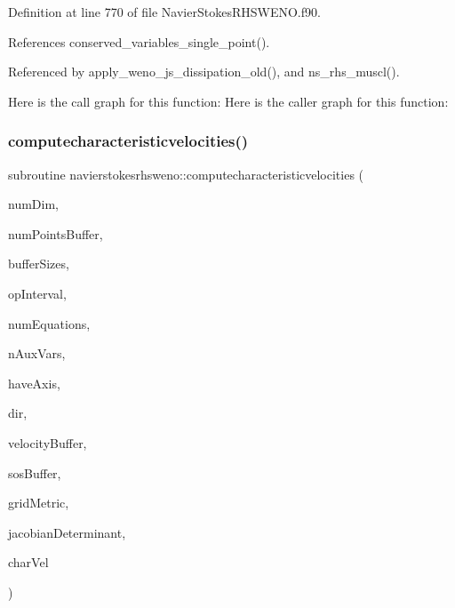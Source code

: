 Definition at line 770 of file Navier\+Stokes\+R\+H\+S\+W\+E\+N\+O.\+f90.



References conserved\+\_\+variables\+\_\+single\+\_\+point().



Referenced by apply\+\_\+weno\+\_\+js\+\_\+dissipation\+\_\+old(), and ns\+\_\+rhs\+\_\+muscl().

Here is the call graph for this function\+:
Here is the caller graph for this function\+:
\hypertarget{namespacenavierstokesrhsweno_a4481b668ca0b9a3c6adf1ebc7649268f}{}\label{namespacenavierstokesrhsweno_a4481b668ca0b9a3c6adf1ebc7649268f} 
\subsubsection{\texorpdfstring{computecharacteristicvelocities()}{computecharacteristicvelocities()}}
{\footnotesize\ttfamily subroutine navierstokesrhsweno\+::computecharacteristicvelocities (\begin{DoxyParamCaption}\item[{integer(kind=4), intent(in)}]{num\+Dim,  }\item[{integer(kind=8), intent(in)}]{num\+Points\+Buffer,  }\item[{integer(kind=8), dimension(numdim), intent(in)}]{buffer\+Sizes,  }\item[{integer(kind=8), dimension(2$\ast$numdim), intent(in)}]{op\+Interval,  }\item[{integer(kind=4), intent(in)}]{num\+Equations,  }\item[{integer(kind=4), intent(in)}]{n\+Aux\+Vars,  }\item[{integer(kind=4), intent(in)}]{have\+Axis,  }\item[{integer(kind=4), intent(in)}]{dir,  }\item[{real(kind=8), dimension(numdim$\ast$numpointsbuffer), intent(in)}]{velocity\+Buffer,  }\item[{real(kind=8), dimension(numpointsbuffer), intent(in)}]{sos\+Buffer,  }\item[{real(kind=8), dimension(numdim$\ast$numdim$\ast$numpointsbuffer), intent(in)}]{grid\+Metric,  }\item[{real(kind=8), dimension(numpointsbuffer), intent(in)}]{jacobian\+Determinant,  }\item[{real(kind=8), dimension(3$\ast$numpointsbuffer), intent(out)}]{char\+Vel }\end{DoxyParamCaption})}



